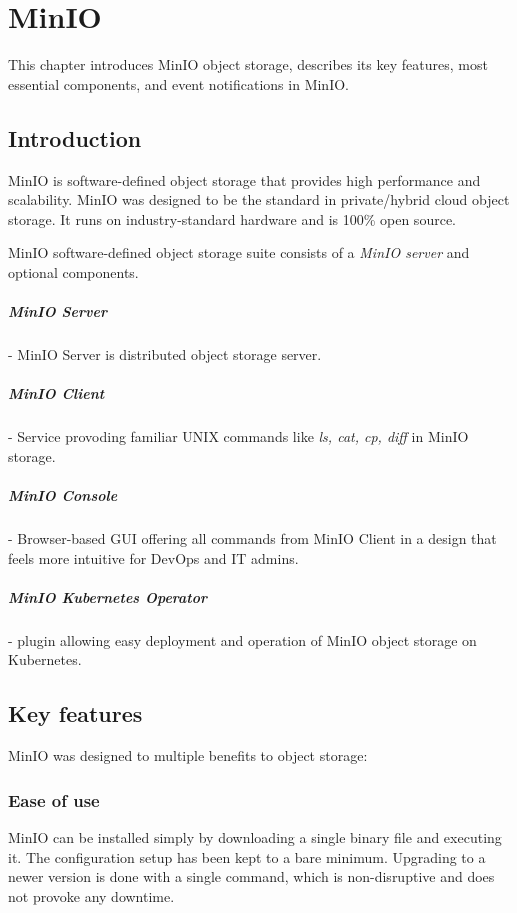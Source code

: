 \chapter{MinIO}\label{chap:minio}
This chapter introduces MinIO object storage, describes its key features, most essential components, and event notifications in MinIO.

\section{Introduction}
    MinIO is software-defined object storage that provides high performance and scalability. MinIO was designed to be the standard in private/hybrid cloud object storage.
    It runs on industry-standard hardware and is 100\% open source\cite{minioObjectStorage}.

    MinIO software-defined object storage suite consists of a \textit{MinIO server} and optional components.

    \paragraph{MinIO Server} - MinIO Server is distributed object storage server.
    \paragraph{MinIO Client} - Service provoding familiar UNIX commands like \textit{ls, cat, cp, diff} in MinIO storage.
    \paragraph{MinIO Console} - Browser-based GUI offering all commands from MinIO Client in a design that feels more intuitive for DevOps and IT admins.
    \paragraph{MinIO Kubernetes Operator} - plugin allowing easy deployment and operation of MinIO object storage on Kubernetes.

\section{Key features}
    MinIO was designed to multiple benefits to object storage:

    \subsection*{Ease of use}
    MinIO can be installed simply by downloading a single binary file and executing it. The configuration setup has been kept to a bare minimum. Upgrading to a newer version is done with a single command, which is non-disruptive and does not provoke any downtime\cite{minioIntel}.

